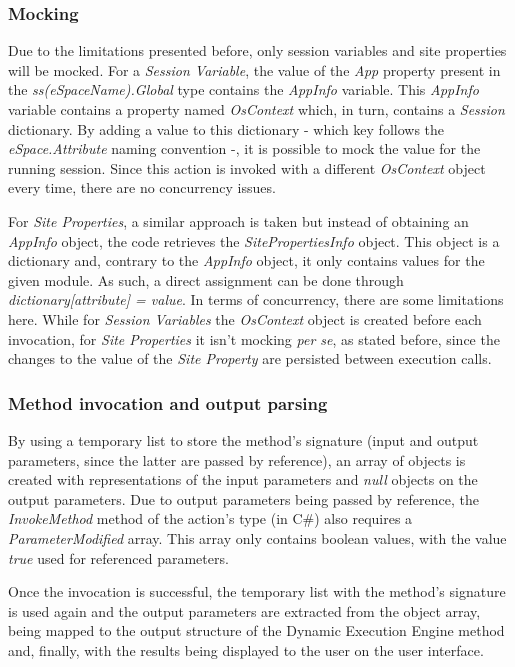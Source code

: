 \documentclass{sigchi}
\begin{document}
\subsubsection{Mocking}
Due to the limitations presented before, only session variables and site properties will be mocked.
For a \textit{Session Variable}, the value of the \textit{App} property present in the \textit{ss(eSpaceName).Global} type contains the \textit{AppInfo} variable. This \textit{AppInfo} variable contains a property named \textit{OsContext} which, in turn, contains a \textit{Session} dictionary. By adding a value to this dictionary - which key follows the \textit{eSpace.Attribute} naming convention -, it is possible to mock the value for the running session. Since this action is invoked with a different \textit{OsContext} object every time, there are no concurrency issues.

For \textit{Site Properties}, a similar approach is taken but instead of obtaining an \textit{AppInfo} object, the code retrieves the \textit{SitePropertiesInfo} object. This object is a dictionary and, contrary to the \textit{AppInfo} object, it only contains values for the given module. As such, a direct assignment can be done through \textit{dictionary[attribute] = value}. In terms of concurrency, there are some limitations here. While for \textit{Session Variables} the \textit{OsContext} object is created before each invocation, for \textit{Site Properties} it isn't mocking \textit{per se}, as stated before, since the changes to the value of the \textit{Site Property} are persisted between execution calls.

\subsubsection{Method invocation and output parsing}
By using a temporary list to store the method's signature (input and output parameters, since the latter are passed by reference), an array of objects is created with representations of the input parameters and \textit{null} objects on the output parameters. Due to output parameters being passed by reference, the \textit{InvokeMethod} method of the action's type (in C\#) also requires a \textit{ParameterModified} array. This array only contains boolean values, with the value \textit{true} used for referenced parameters.

Once the invocation is successful, the temporary list with the method's signature is used again and the output parameters are extracted from the object array, being mapped to the output structure of the Dynamic Execution Engine method and, finally, with the results being displayed to the user on the user interface.
\end{document}
